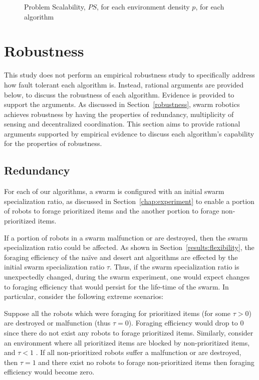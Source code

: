 \begin{figure}[!htb]
\centering
\resizebox{\textwidth}{!}{}
\caption{Problem Scalability, $PS$, for each environment density $p$, for each algorithm}
\label{fig:problemscalability}
\end{figure}

\section{Robustness}
\label{results:robustness}
This study does not perform an empirical robustness study to specifically address how fault tolerant each algorithm is. Instead, rational arguments are provided below, to discuss the robustness of each algorithm. Evidence is provided to support the arguments. As discussed in Section~\ref{robustness}, swarm robotics achieves robustness by having the properties of redundancy, multiplicity of sensing and decentralized coordination. This section aims to provide rational arguments supported by empirical evidence to discuss each  algorithm's capability for the properties of robustness.

\subsection{Redundancy}
\label{results:redundancy}
For each of our algorithms, a swarm is configured with an initial swarm specialization ratio, as discussed in Section~\ref{chap:experiment} to enable a portion of robots to forage prioritized items and the another portion to forage non-prioritized items. 

If a portion of robots in a swarm malfunction or are destroyed, then the swarm specialization ratio could be affected. As shown in Section~\ref{results:flexibility}, the foraging efficiency of the na\"ive and desert ant algorithms are effected by the initial swarm specialization ratio $\tau$. Thus, if the swarm specialization ratio is unexpectedly changed, during the swarm experiment, one would expect changes to foraging efficiency that would persist for the life-time of the swarm. In particular, consider the following extreme scenarios: 

Suppose all the robots which were foraging for prioritized items (for some $\tau > 0$) are destroyed or malfunction (thus $\tau=0$). Foraging efficiency would drop to 0 since there do not exist any robots to forage prioritized items. Similarly, consider an environment where all prioritized items are blocked by non-prioritized items, and $\tau < 1$ . If all non-prioritized robots suffer a malfunction or are destroyed, then $\tau=1$ and there exist no robots to forage non-prioritized items then foraging efficiency would become zero. 

